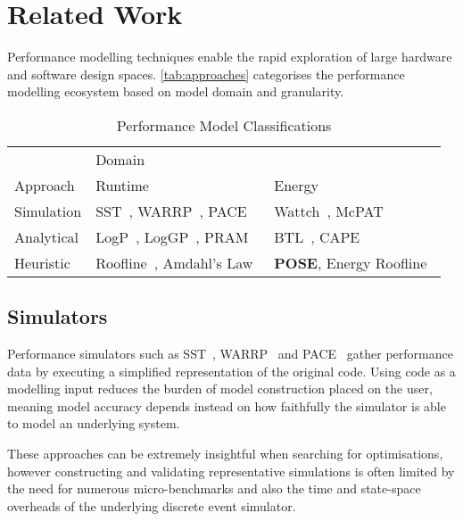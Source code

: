 \section{Related Work}
\label{sec:related}
\noindent
Performance modelling techniques enable the rapid exploration of large hardware and software design spaces.
\autoref{tab:approaches} categorises the performance modelling ecosystem based on model domain and granularity.

\begin{table}
  \centering
  \scriptsize
  \setlength{\tabcolsep}{.7em} 
  \caption{Performance Model Classifications}
  \begin{tabular}{lll}
  \toprule
    & \multicolumn{2}{l}{Domain}\\ \cmidrule(){2-3}
    Approach & Runtime & Energy \\
    \midrule
  Simulation & SST~\cite{rodrigues:2011aa}, WARRP~\cite{hammond:2009aa}, PACE~\cite{cao:2000aa} & Wattch~\cite{brooks:2000aa}, McPAT~\cite{li:2009aa}  \\
  Analytical & LogP~\cite{culler:1993aa}, LogGP~\cite{alexandrov:1997aa}, PRAM~\cite{karp:1991aa}  & BTL~\cite{manousakis:2012aa}, CAPE~\cite{kamble:1997aa} \\
  Heuristic & Roofline~\cite{williams:2009aa}, Amdahl's Law~\cite{amdahl:1967aa} & \textbf{POSE}, Energy Roofline~\cite{choi:2013aa} \\
  \bottomrule
  \end{tabular}
  \label{tab:approaches}
\end{table}

\noindent
\subsection{Simulators} 
Performance simulators such as SST~\cite{rodrigues:2011aa}, WARRP~\cite{hammond:2009aa} and PACE~\cite{cao:2000aa} gather performance data by executing a simplified representation of the original code.
Using code as a modelling input reduces the burden of model construction placed on the user, meaning model accuracy depends instead on how faithfully the simulator is able to model an underlying system.

These approaches can be extremely insightful when searching for optimisations, however constructing and validating representative simulations is often limited by the need for numerous micro-benchmarks and also the time and state-space overheads of the underlying discrete event simulator.

